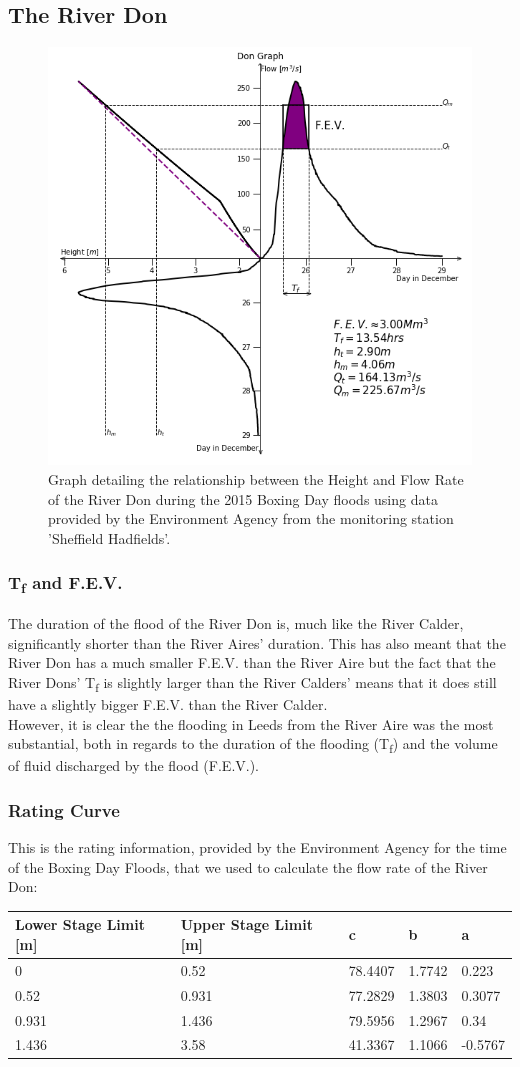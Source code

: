 \documentclass[11 pt, a4paper]{article}
\begin{document}
\subsection{The River Don}
\begin{figure}[H]
\begin{center}
\includegraphics[width=.5\linewidth]{Don-Quadrant_Graph.png}
\caption{Graph detailing the relationship between the Height and Flow Rate of the River Don during the 2015 Boxing Day floods using data provided by the Environment Agency from the monitoring station 'Sheffield Hadfields'.}
\end{center}
\end{figure}
\subsubsection{T\textsubscript{f} and F.E.V.}
The duration of the flood of the River Don is, much like the River Calder, significantly shorter than the River Aires' duration. This has also meant that the River Don has a much smaller F.E.V. than the River Aire but the fact that the River Dons' T\textsubscript{f} is slightly larger than the River Calders' means that it does still have a slightly bigger F.E.V. than the River Calder. \\
However, it is clear the the flooding in Leeds from the River Aire was the most substantial, both in regards to the duration of the flooding (T\textsubscript{f}) and the volume of fluid discharged by the flood (F.E.V.).\\
\subsubsection{Rating Curve}
This is the rating information, provided by the Environment Agency for the time of the Boxing Day Floods, that we used to calculate the flow rate of the River Don:
\begin{center}
\begin{tabular}{|l|l|l|l|l|}
\hline
Lower Stage Limit {[}m{]} & Upper Stage Limit {[}m{]} & c & b & a \\
\hline
0 & 0.52 & 78.4407 & 1.7742 & 0.223 \\
0.52 & 0.931 & 77.2829 & 1.3803 & 0.3077 \\
0.931 & 1.436 & 79.5956 & 1.2967 & 0.34 \\
1.436 & 3.58 & 41.3367 & 1.1066 & -0.5767 \\
\hline
\end{tabular}
\end{center}
\end{document}
